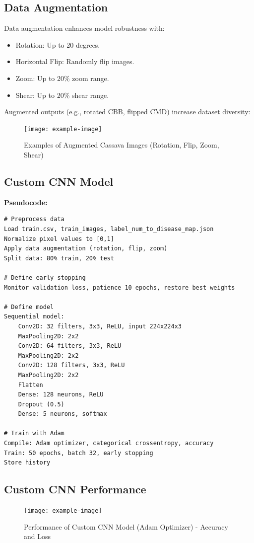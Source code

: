 \documentclass[a4paper,12pt]{article}
\begin{document}
\subsection*{Data Augmentation}
Data augmentation enhances model robustness with:
\begin{itemize}
    \item Rotation: Up to 20 degrees.
    \item Horizontal Flip: Randomly flip images.
    \item Zoom: Up to 20\% zoom range.
    \item Shear: Up to 20\% shear range.
\end{itemize}
Augmented outputs (e.g., rotated CBB, flipped CMD) increase dataset diversity:

\begin{figure}[H]
    \centering
    \texttt{[image: example-image]}
    \caption{Examples of Augmented Cassava Images (Rotation, Flip, Zoom, Shear)}
\end{figure}

\subsection*{Custom CNN Model}
\textbf{Pseudocode:}
\begin{verbatim}
# Preprocess data
Load train.csv, train_images, label_num_to_disease_map.json
Normalize pixel values to [0,1]
Apply data augmentation (rotation, flip, zoom)
Split data: 80% train, 20% test

# Define early stopping
Monitor validation loss, patience 10 epochs, restore best weights

# Define model
Sequential model:
    Conv2D: 32 filters, 3x3, ReLU, input 224x224x3
    MaxPooling2D: 2x2
    Conv2D: 64 filters, 3x3, ReLU
    MaxPooling2D: 2x2
    Conv2D: 128 filters, 3x3, ReLU
    MaxPooling2D: 2x2
    Flatten
    Dense: 128 neurons, ReLU
    Dropout (0.5)
    Dense: 5 neurons, softmax

# Train with Adam
Compile: Adam optimizer, categorical crossentropy, accuracy
Train: 50 epochs, batch 32, early stopping
Store history
\end{verbatim}

\subsection*{Custom CNN Performance}
\begin{figure}[H]
    \centering
    \texttt{[image: example-image]}
    \caption{Performance of Custom CNN Model (Adam Optimizer) - Accuracy and Loss}
\end{figure}
\end{document}
